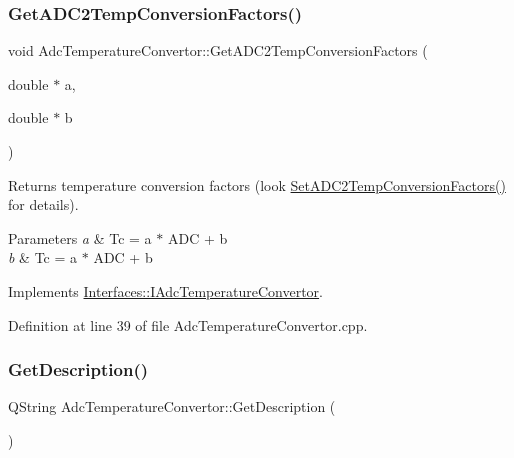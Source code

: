 \subsubsection{\texorpdfstring{Get\+A\+D\+C2\+Temp\+Conversion\+Factors()}{GetADC2TempConversionFactors()}}
{\footnotesize\ttfamily void Adc\+Temperature\+Convertor\+::\+Get\+A\+D\+C2\+Temp\+Conversion\+Factors (\begin{DoxyParamCaption}\item[{double $\ast$}]{a,  }\item[{double $\ast$}]{b }\end{DoxyParamCaption})\hspace{0.3cm}{\ttfamily [virtual]}}



Returns temperature conversion factors (look \hyperlink{class_adc_temperature_convertor_a5a19355f805554763e914e5b2216d5f6}{Set\+A\+D\+C2\+Temp\+Conversion\+Factors()} for details). 


\begin{DoxyParams}{Parameters}
{\em a} & Tc = a $\ast$ A\+DC + b \\
\hline
{\em b} & Tc = a $\ast$ A\+DC + b \\
\hline
\end{DoxyParams}


Implements \hyperlink{class_interfaces_1_1_i_adc_temperature_convertor_a61cff0aa0590906acfb18c9b789dceb2}{Interfaces\+::\+I\+Adc\+Temperature\+Convertor}.



Definition at line 39 of file Adc\+Temperature\+Convertor.\+cpp.

\mbox{\label{class_adc_temperature_convertor_ad82afdddbac46a95b6da44e769180d10}} 
\subsubsection{\texorpdfstring{Get\+Description()}{GetDescription()}}
{\footnotesize\ttfamily Q\+String Adc\+Temperature\+Convertor\+::\+Get\+Description (\begin{DoxyParamCaption}{ }\end{DoxyParamCaption})\hspace{0.3cm}{\ttfamily [virtual]}}



